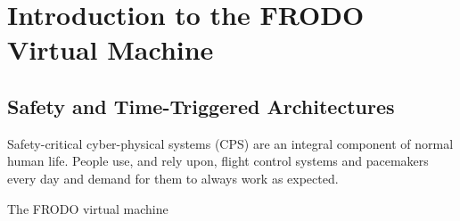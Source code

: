 \chapter{Introduction to the FRODO Virtual Machine}


\section{Safety and Time-Triggered Architectures}

Safety-critical cyber-physical systems (CPS) are an integral component of normal human life.  People use, and rely upon, flight control systems and pacemakers every day and demand for them to always work as expected.

The FRODO virtual machine
